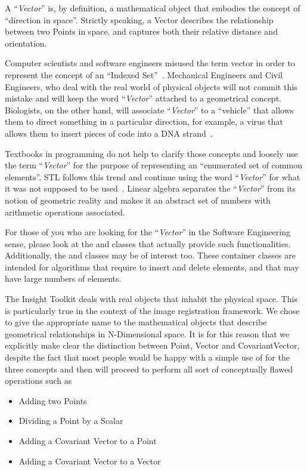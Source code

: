 A ``\emph{Vector}'' is, by definition, a mathematical object that embodies the
concept of ``direction in space''. Strictly speaking, a Vector describes the
relationship between two Points in space, and captures both their relative
distance and orientation.

Computer scientists and software engineers misused the term vector in order to
represent the concept of an ``Indexed Set''~\cite{Austern1999}.  Mechanical
Engineers and Civil Engineers, who deal with the real world of physical objects
will not commit this mistake and will keep the word ``\emph{Vector}'' attached
to a geometrical concept.  Biologists, on the other hand, will associate
``\emph{Vector}'' to a ``vehicle'' that allows them to direct something in a
particular direction, for example, a virus that allows them to insert pieces of
code into a DNA strand~\cite{Lodish2000}.

Textbooks in programming do not help to clarify those concepts and loosely use
the term ``\emph{Vector}'' for the purpose of representing an ``enumerated set
of common elements''. STL follows this trend and continue using the word
``\emph{Vector}'' for what it was not supposed to be
used~\cite{Austern1999,Alexandrescu2001}. Linear algebra separates the
``\emph{Vector}'' from its notion of geometric reality and makes it an
abstract set of numbers with arithmetic operations associated.

For those of you who are looking for the ``\emph{Vector}'' in the Software
Engineering sense, please look at the  and 
classes that actually provide such functionalities. Additionally, the
 and  classes may be of interest
too. These container classes are intended for algorithms that require to insert
and delete elements, and that may have large numbers of elements.

The Insight Toolkit deals with real objects that inhabit the physical space.
This is particularly true in the context of the image registration framework.
We chose to give the appropriate name to the mathematical objects that describe
geometrical relationships in N-Dimensional space. It is for this reason that we
explicitly make clear the distinction between Point, Vector and CovariantVector,
despite the fact that most people would be happy with a simple use of
 for the three concepts and then will proceed to perform all
sort of conceptually flawed operations such as 

\begin{itemize}
\item Adding two Points
\item Dividing a Point by a Scalar
\item Adding a Covariant Vector to a Point
\item Adding a Covariant Vector to a Vector
\end{itemize}

